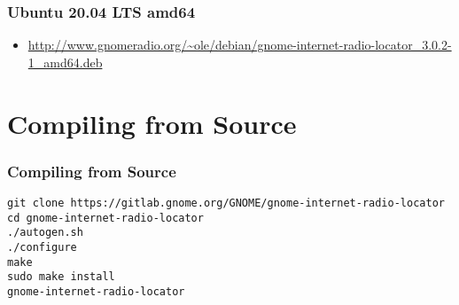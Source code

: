 \documentclass[aspectratio=43]{beamer}
\begin{document}
\begin{frame}
\frametitle{Ubuntu 20.04 LTS amd64}

    \begin{itemize}
        \item \url{http://www.gnomeradio.org/~ole/debian/gnome-internet-radio-locator\_3.0.2-1\_amd64.deb}
    \end{itemize}

\end{frame}

\section{Compiling from Source}

\begin{frame}
\frametitle{Compiling from Source}

    \texttt{git clone https://gitlab.gnome.org/GNOME/gnome-internet-radio-locator\\
cd gnome-internet-radio-locator\\
./autogen.sh\\
./configure\\
make\\
sudo make install\\
gnome-internet-radio-locator}

\end{frame}
\end{document}
